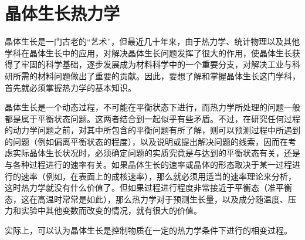 ﻿\chapter{晶体生长热力学}
晶体生长是一门古老的“艺术”，但最近几十年来，由于热力学、统计物理以及其他学科在晶体生长中的应用，对解决晶体生长问题发挥了很大的作用，使晶体生长获得了牢固的科学基础，逐步发展成为材料科学中的一个重要分支，对解决工业与科研所需的材料问题做出了重要的贡献。因此，要想了解和掌握晶体生长这门学科，首先就必须掌握热力学的基本知识。

晶体生长是一个动态过程，不可能在平衡状态下进行，而热力学所处理的问题一般都是属于平衡状态问题。这两者结合到一起似乎有些矛盾。不过，在研究任何过程的动力学问题之前，对其中所包含的平衡问题有所了解，则可以预测过程中所遇到的问题（例如偏离平衡状态的程度），以及说明或提出解决问题的线索，因而在考虑实际晶体生长状况时，必须确定问题的实质究竟是与达到的平衡状态有关，还是与各种过程进行的速率有关。如果晶体生长的速率或晶体的形态取决于某一过程进行的速率（例如，在表面上的成核速率），那么就必须用适当的速率理论来分析，这时热力学就没有什么价值了。但如果过程进行程度非常接近于平衡态（准平衡态，这在高温时常常是如此），那么热力学对于预测生长量，以及成分随温度、压力和实验中其他变数而改变的情况，就有很大的价值。

实际上，可以认为晶体生长是控制物质在一定的热力学条件下进行的相变过程。




